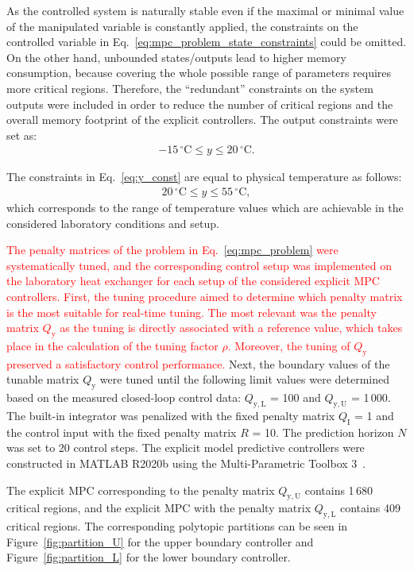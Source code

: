 \documentclass[preprint,12pt]{elsarticle}
\newcommand{\change}[1]{\textcolor{red}{#1}}
\begin{document}
As the controlled system is naturally stable even if the maximal or minimal value of the manipulated variable is constantly applied, the constraints on the controlled variable in Eq.~\eqref{eq:mpc_problem_state_constraints} could be omitted. On the other hand, unbounded states/outputs lead to higher memory consumption, because covering the whole possible range of parameters requires more critical regions. Therefore, the ``redundant'' constraints on the system outputs were included in order to reduce the number of critical regions and the overall memory footprint of the explicit controllers. The output constraints were set as: 
\begin{eqnarray}
	\label{eq:y_const}
	-15\,^{\circ}\mathrm{C} \le y \le 20\,^{\circ}\mathrm{C}.
\end{eqnarray}	

The constraints in Eq.~\eqref{eq:y_const} are equal to physical temperature as follows:
\begin{eqnarray}
	\label{eq:Y_const}
	20\,^{\circ}\mathrm{C} \le y \le 55\,^{\circ}\mathrm{C},
\end{eqnarray}
which corresponds to the range of temperature values which are achievable in the considered laboratory conditions and setup.		 

\change{The penalty matrices of the problem in Eq.~\eqref{eq:mpc_problem} were systematically tuned, and the corresponding control setup was implemented on the laboratory heat exchanger for each setup of the considered explicit MPC controllers. 
First, the tuning procedure aimed to determine which penalty matrix is the most suitable for real-time tuning. The most relevant was the penalty matrix $Q_\mathrm{y}$ as the tuning is directly associated with a reference value, which takes place in the calculation of the tuning factor $\rho$. Moreover, the tuning of $Q_\mathrm{y}$ preserved a satisfactory control performance.} Next, the boundary values of the tunable matrix $Q_\mathrm{y}$ were tuned until the following limit values were determined based on the measured closed-loop control data: $Q_\mathrm{y, L}$ = 100 and $Q_\mathrm{y, U}$ = 1\,000. The built-in integrator was penalized with the fixed penalty matrix $Q_\mathrm{I}$ = 1 and the control input with the fixed penalty matrix $R$ = 10. The prediction horizon $N$ was set to 20 control steps. The explicit model predictive controllers were constructed in MATLAB R2020b using the Multi-Parametric Toolbox 3~\cite{mpt_conf}. 

The explicit MPC corresponding to the penalty matrix $Q_\mathrm{y, U}$ contains 1\,680 critical regions, and the explicit MPC with the penalty matrix $Q_\mathrm{y, L}$ contains 409 critical regions. The corresponding polytopic partitions can be seen in Figure~\ref{fig:partition_U} for the upper boundary controller and Figure~\ref{fig:partition_L} for the lower boundary controller.  
\end{document}
